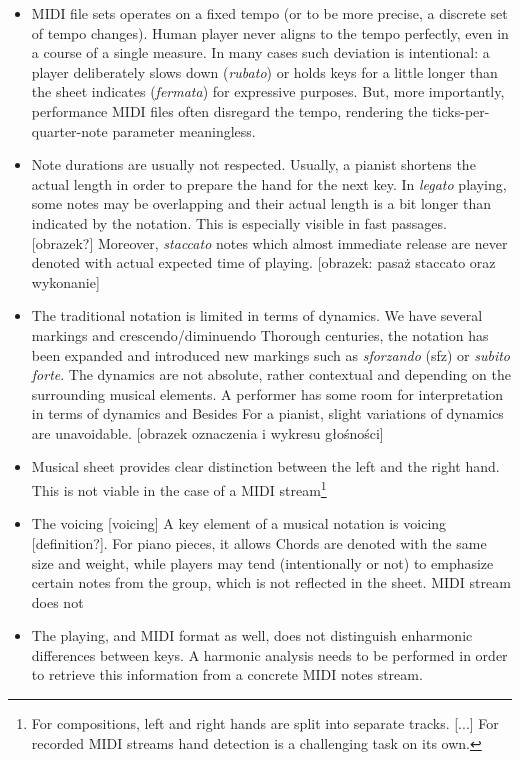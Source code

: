 \begin{itemize}
	\item MIDI file sets operates on a fixed tempo (or to be more precise, a discrete set of tempo changes). Human player never aligns to the tempo perfectly, even in a course of a single measure. In many cases such deviation is intentional: a player deliberately slows down (\emph{rubato}) or holds keys for a little longer than the sheet indicates (\emph{fermata}) for expressive purposes. But, more importantly, performance MIDI files often disregard the tempo, rendering the ticks-per-quarter-note parameter meaningless.
	\item Note durations are usually not respected. Usually, a pianist shortens the actual length in order to prepare the hand for the next key.
	 In \emph{legato} playing, some notes may be overlapping and their actual length is a bit longer than indicated by the notation. This is especially visible in fast passages. [obrazek?]
	 Moreover, \emph{staccato} notes which almost immediate release are never denoted with actual expected time of playing. [obrazek: pasaż staccato oraz wykonanie]
	\item The traditional notation is limited in terms of dynamics. We have several markings and crescendo/diminuendo Thorough centuries, the notation has been expanded and introduced new markings such as \emph{sforzando} (sfz) or \emph{subito forte}.
	 The dynamics are not absolute, rather contextual and depending on the surrounding musical elements. 	 A performer has some room for interpretation in terms of dynamics and
	 Besides For a pianist, slight variations of dynamics are unavoidable.  [obrazek oznaczenia i wykresu głośności]
	\item Musical sheet provides clear distinction between the left and the right hand. This is not viable in the case of a MIDI stream\footnote{For compositions, left and right hands are split into separate tracks. [...] For recorded MIDI streams hand detection is a challenging task on its own.}
	\item The voicing [voicing]
	A key element of a musical notation is voicing [definition?]. For piano pieces, it allows 
	Chords are denoted with the same size and weight, while players may tend (intentionally or not) to emphasize certain notes from the group, which is not reflected in the sheet.
	MIDI stream does not 
	\item The playing, and MIDI format as well, does not distinguish enharmonic differences between keys. A harmonic analysis needs to be performed in order to retrieve this information from a concrete MIDI notes stream.
\end{itemize}

